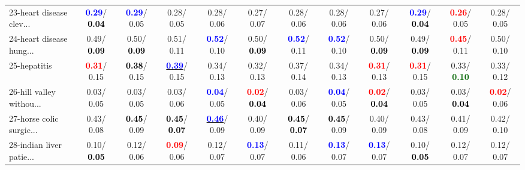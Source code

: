 \begin{table}[h]
\begin{center}
{\begin{tabular}{lc|c|c|c|c|c|c|c|c|c|c}
23-heart disease clev... & \textcolor{blue}{\textbf{  0.29}}/\textcolor{black}{\textbf{  0.04}} & \textcolor{blue}{\textbf{  0.29}}/  0.05 &   0.28/  0.05 &   0.28/  0.06 &   0.27/  0.07 &   0.28/  0.06 &   0.28/  0.06 &   0.27/  0.06 & \textcolor{blue}{\textbf{  0.29}}/\textcolor{black}{\textbf{  0.04}} & \textcolor{red}{\textbf{  0.26}}/  0.05 &   0.28/  0.05 \\
24-heart disease hung... &   0.49/\textcolor{black}{\textbf{  0.09}} &   0.50/\textcolor{black}{\textbf{  0.09}} &   0.51/  0.11 & \textcolor{blue}{\textbf{  0.52}}/  0.10 &   0.50/\textcolor{black}{\textbf{  0.09}} & \textcolor{blue}{\textbf{  0.52}}/  0.11 & \textcolor{blue}{\textbf{  0.52}}/  0.10 &   0.50/\textcolor{black}{\textbf{  0.09}} &   0.49/\textcolor{black}{\textbf{  0.09}} & \textcolor{red}{\textbf{  0.45}}/  0.11 &   0.50/  0.10 \\
25-hepatitis & \textcolor{red}{\textbf{  0.31}}/  0.15 & \textcolor{black}{\textbf{  0.38}}/  0.15 & \underline{\textcolor{blue}{\textbf{  0.39}}}/  0.15 &   0.34/  0.13 &   0.32/  0.13 &   0.37/  0.14 &   0.34/  0.13 & \textcolor{red}{\textbf{  0.31}}/  0.13 & \textcolor{red}{\textbf{  0.31}}/  0.15 &   0.33/\textcolor{darkgreen}{\textbf{  0.10}} &   0.33/  0.12 \\
26-hill valley withou... &   0.03/  0.05 &   0.03/  0.05 &   0.03/  0.06 & \textcolor{blue}{\textbf{  0.04}}/  0.05 & \textcolor{red}{\textbf{  0.02}}/\textcolor{black}{\textbf{  0.04}} &   0.03/  0.06 & \textcolor{blue}{\textbf{  0.04}}/  0.05 & \textcolor{red}{\textbf{  0.02}}/\textcolor{black}{\textbf{  0.04}} &   0.03/  0.05 &   0.03/\textcolor{black}{\textbf{  0.04}} & \textcolor{red}{\textbf{  0.02}}/  0.06 \\
27-horse colic surgic... &   0.43/  0.08 & \textcolor{black}{\textbf{  0.45}}/  0.09 & \textcolor{black}{\textbf{  0.45}}/\textcolor{black}{\textbf{  0.07}} & \underline{\textcolor{blue}{\textbf{  0.46}}}/  0.09 &   0.40/  0.09 & \textcolor{black}{\textbf{  0.45}}/\textcolor{black}{\textbf{  0.07}} & \textcolor{black}{\textbf{  0.45}}/  0.09 &   0.40/  0.09 &   0.43/  0.08 &   0.41/  0.09 &   0.42/  0.10 \\
28-indian liver patie... &   0.10/\textcolor{black}{\textbf{  0.05}} &   0.12/  0.06 & \textcolor{red}{\textbf{  0.09}}/  0.06 &   0.12/  0.07 & \textcolor{blue}{\textbf{  0.13}}/  0.07 &   0.11/  0.06 & \textcolor{blue}{\textbf{  0.13}}/  0.07 & \textcolor{blue}{\textbf{  0.13}}/  0.07 &   0.10/\textcolor{black}{\textbf{  0.05}} &   0.12/  0.07 &   0.12/  0.07 \\ \hline

\end{tabular}}
\end{center}
\end{table}
